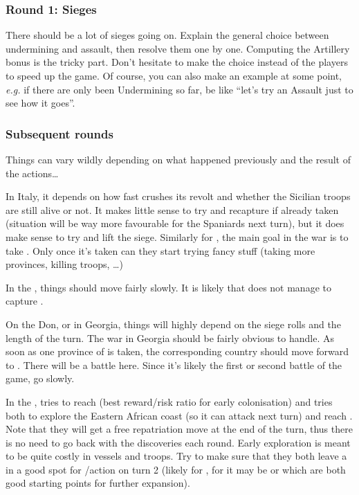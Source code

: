\subsubsection{Round 1: Sieges}
\aparag There should be a lot of sieges going on. Explain the general choice
between undermining and assault, then resolve them one by one. Computing the
Artillery bonus is the tricky part.
\bparag Don't hesitate to make the choice instead of the players to speed up
the game.
\bparag Of course, you can also make an example at some point, \emph{e.g.} if
there are only been Undermining so far, be like ``let's try an Assault just to
see how it goes''.

\subsubsection{Subsequent rounds}
Things can vary wildly depending on what happened previously and the result of
the actions\ldots

\aparag In Italy, it depends on how fast \HIS crushes its revolt and whether
the Sicilian troops are still alive or not.
\bparag It makes little sense to try and recapture \villeNaples if already
taken (situation will be way more favourable for the Spaniards next turn), but
it does make sense to try and lift the siege.
\bparag Similarly for \FRA, the main goal in the war is to take
\villeNaples. Only once it's taken can they start trying fancy stuff (taking
more provinces, killing troops, \ldots)

\aparag In the \regionBalkans, things should move fairly slowly. It is likely
that \VEN does not manage to capture \villeRagusa.

\aparag On the Don, or in Georgia, things will highly depend on the siege
rolls and the length of the turn. The war in Georgia should be fairly obvious
to handle.
\bparag As soon as one province of \paysCosaquesdon is taken, the
corresponding country should move forward to \provinceDon. There will be a
battle here. Since it's likely the first or second battle of the game, go
slowly.

\aparag In the \ROTW, \HIS tries to reach \granderegionCuba (best reward/risk
ratio for early colonisation) and \POR tries both to explore the Eastern
African coast (so it can attack \paysGujerat next turn) and reach
.
\bparag Note that they will get a free repatriation move at the end of the
turn, thus there is no need to go back with the discoveries each round.
\bparag Early exploration is meant to be quite costly in vessels and troops.
\bparag Try to make sure that they both leave a \LeaderC in a good spot for
\COL/\TP action on turn 2 (likely \granderegionCuba for \HIS, for \POR it may
be  or  which are both good starting
points for further expansion).

